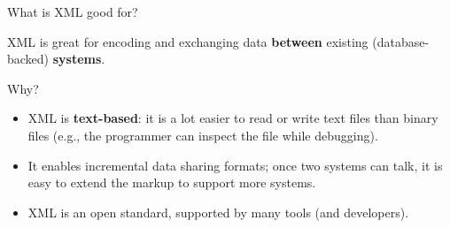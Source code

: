 
\begin{frame}{What is XML good for?}

XML is great for \alert{encoding and exchanging data} \textbf{between} existing (database-backed) \textbf{systems}.

Why?
\begin{itemize}[-]
\item XML is \textbf{text-based}: it is a lot easier to read or write text files than binary files (e.g., the programmer can inspect the file while debugging).
\item It enables incremental data sharing formats; once two systems can talk, it is easy to extend the markup to support more systems.
\item XML is an open standard, supported by many tools (and developers).
\end{itemize}

\end{frame}

